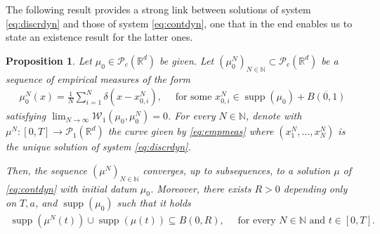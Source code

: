 \documentclass[A4paper,11pt]{article}
\newtheorem{proposition}[theorem]{Proposition}
\theoremstyle{definition}
\newcommand{\N}{\mathbb{N}}
\newcommand{\R}{\mathbb{R}}
\newcommand{\W}{\mathcal{W}}
\newcommand{\PP}{\mathcal{P}_1}
\newcommand{\PC}{\mathcal{P}_c}
\DeclareMathOperator{\supp}{supp}
\begin{document}
The following result provides a strong link between solutions of system \eqref{eq:discrdyn} and those of system \eqref{eq:contdyn}, one that in the end enables us to state an existence result for the latter ones. 

\begin{proposition}\label{pr:exist}
Let $\mu_0 \in \PC(\R^d)$ be given. Let $(\mu^{N}_0)_{N \in \N} \subset \PC(\R^d)$ be a sequence of empirical measures of the form
\begin{align*}
\mu^{N}_0(x) = \frac{1}{N}\sum^N_{i = 1} \delta(x - x^{N}_{0,i}), \quad \text{ for some } x^{N}_{0,i} \in \supp(\mu_0) + \overline{B(0,1)}
\end{align*}
satisfying $\lim_{N \rightarrow \infty} \W_1(\mu_0,\mu^{N}_0) = 0$. For every $N \in \N$, denote with $\mu^N:[0,T] \rightarrow \PP(\R^{d})$ the curve given by \eqref{eq:empmeas} where $(x^N_1,\ldots,x^N_N)$ is the unique solution of system \eqref{eq:discrdyn}.

Then, the sequence $(\mu^N)_{N \in \N}$ converges, up to subsequences, to a solution $\mu$ of \eqref{eq:contdyn} with initial datum $\mu_0$. Moreover, there exists $R > 0$ depending only on $T,a$, and $\supp(\mu_0)$ such that it holds
\begin{align*}
\supp(\mu^N(t)) \cup \supp(\mu(t)) \subseteq B(0,R), \quad \text{ for every } N \in \N \text{ and } t \in [0,T].
\end{align*}
\end{proposition}
\end{document}
